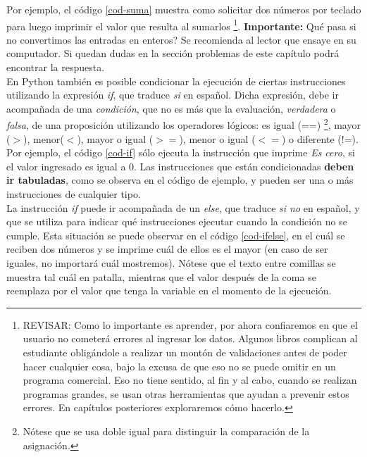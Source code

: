  Por ejemplo, el código \ref{cod-suma} muestra como solicitar dos números por teclado para luego imprimir el valor que resulta al sumarlos \footnote{REVISAR: Como lo importante es aprender, por ahora confiaremos en que el usuario no cometerá errores al ingresar los datos. Algunos libros complican al estudiante obligándole a realizar un montón de validaciones antes de poder hacer cualquier cosa, bajo la excusa de que eso no se puede omitir en un programa comercial. Eso no tiene sentido, al fin y al cabo, cuando se realizan programas grandes, se usan otras herramientas que ayudan a prevenir estos errores. En capítulos posteriores exploraremos cómo hacerlo.}. \textbf{Importante:} Qué pasa si no convertimos las entradas en enteros? Se recomienda al lector que ensaye en su computador. Si quedan dudas en la sección problemas de este capítulo podrá encontrar la respuesta. \\



En Python también es posible condicionar la ejecución de ciertas instrucciones utilizando la expresión \emph{if}, que traduce \emph{si} en español. Dicha expresión, debe ir acompañada de una \emph{condición}, que no es más que la evaluación, \emph{verdadera} o \emph{falsa}, de una proposición utilizando los operadores lógicos: es igual (==) \footnote{Nótese que se usa doble igual para distinguir la comparación de la asignación.}, mayor ($>$), menor($<$), mayor o igual ($>=$), menor o igual ($<=$) o diferente (!=). Por ejemplo, el código \ref{cod-if} sólo ejecuta la instrucción que imprime \emph{Es cero}, si  el valor ingresado es igual a 0. Las instrucciones que están condicionadas \textbf{deben ir tabuladas}, como se observa en el código de ejemplo, y pueden ser una o más instrucciones de cualquier tipo. \\




La instrucción \emph{if} puede ir acompañada de un \emph{else}, que traduce \emph{si no} en español, y que se utiliza para indicar qué instrucciones ejecutar cuando la condición no se cumple. Esta situación se puede observar en el código \ref{cod-ifelse}, en el cuál se reciben dos números y se imprime cuál de ellos es el mayor (en caso de ser iguales, no importará cuál mostremos). Nótese que el texto entre comillas se muestra tal cuál en patalla, mientras que el valor después de la coma se reemplaza por el valor que tenga la variable en el momento de la ejecución. \\

